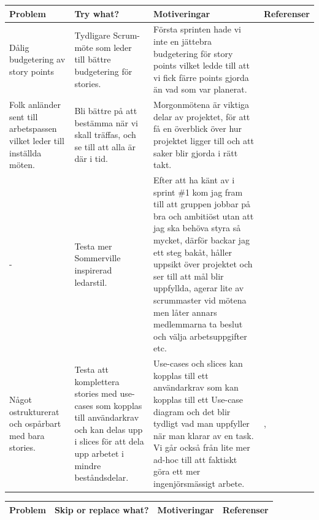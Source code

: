 \documentclass[conference,a4paper]{IEEEtran}
\newcommand\Tstrut{\rule{0pt}{2.6ex}}       %
\newcommand\Bstrut{\rule[-0.9ex]{0pt}{0pt}} %
\newcommand{\TBstrut}{\Tstrut\Bstrut} %
\begin{document}
\begin{table}[H]
	\small
  \centering
	\begin{tabular}{|p{1.5cm}|p{2cm}|p{1.8cm}|p{1.5cm}|} %
    \hline
    Problem & Try what? & Motiveringar & Referenser \TBstrut \\
    \hline
     Dålig budgetering av story points & Tydligare Scrum-möte som leder till bättre budgetering för stories. & Första sprinten hade vi inte en jättebra budgetering för story points vilket ledde till att vi fick färre points gjorda än vad som var planerat. & \TBstrut \\
    \hline
    Folk anländer sent till arbetspassen vilket leder till inställda möten. & Bli bättre på att bestämma när vi skall träffas, och se till att alla är där i tid. & Morgonmötena är viktiga delar av projektet, för att få en överblick över hur projektet ligger till och att saker blir gjorda i rätt takt. & \TBstrut \\  
    \hline
    - &  Testa mer Sommerville inspirerad ledarstil. & Efter att ha känt av i sprint \#1 kom jag fram till att gruppen jobbar på bra och ambitiöst utan att jag ska behöva styra så mycket, därför backar jag ett steg bakåt, håller uppsikt över projektet och ser till att mål blir uppfyllda, agerar lite av scrummaster vid mötena men låter annars medlemmarna ta beslut och välja arbetsuppgifter etc. & \TBstrut \\
    \hline
    Något ostrukturerat och ospårbart med bara stories. & Testa att komplettera stories med use-cases som kopplas till användarkrav och kan delas upp i slices för att dela upp arbetet i mindre beståndsdelar. & Use-cases och slices kan kopplas till ett användarkrav som kan kopplas till ett Use-case diagram och det blir tydligt vad man uppfyller när man klarar av en task. Vi går också från lite mer ad-hoc till att faktiskt göra ett mer ingenjörsmässigt arbete. & \cite{Jacobson16}, \cite{ivarjacobson2017} \TBstrut \\
    \hline
  \end{tabular}
\end{table}

\begin{table}[H]
	\small
  \centering
	\begin{tabular}{|p{1.5cm}|p{2cm}|p{1.8cm}|p{1.5cm}|} %
    \hline
    Problem & Skip or replace what? & Motiveringar & Referenser \TBstrut \\
    \hline
  \end{tabular}
\end{table}
\end{document}
